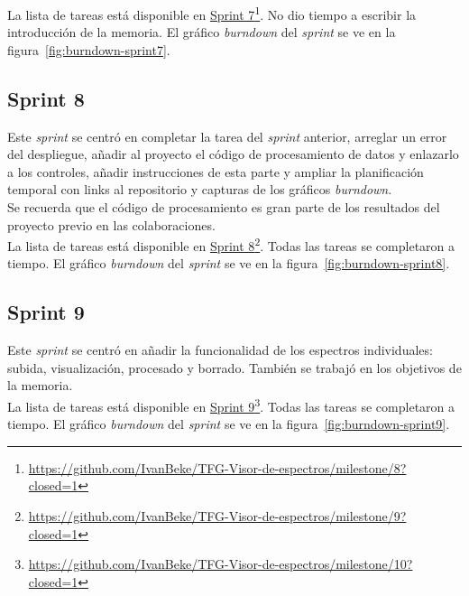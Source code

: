 La lista de tareas está disponible en
\href{https://github.com/IvanBeke/TFG-Visor-de-espectros/milestone/8?closed=1}{Sprint
	7}\footnote{\url{https://github.com/IvanBeke/TFG-Visor-de-espectros/milestone/8?closed=1}}.
No dio tiempo a escribir la introducción de la memoria. El gráfico
\textit{burndown} del \textit{sprint} se ve en la
figura~\ref{fig:burndown-sprint7}.\\


\subsection{Sprint 8}
Este \textit{sprint} se centró en completar la tarea del \textit{sprint}
anterior, arreglar un error del despliegue, añadir al proyecto el código
de procesamiento de datos y enlazarlo a los controles, añadir instrucciones de
esta parte y ampliar la planificación temporal con links al repositorio y
capturas de los gráficos \textit{burndown}.\\

Se recuerda que el código de procesamiento es gran parte de los resultados del
proyecto previo en las colaboraciones.\\

La lista de tareas está disponible en
\href{https://github.com/IvanBeke/TFG-Visor-de-espectros/milestone/9?closed=1}{Sprint
	8}\footnote{\url{https://github.com/IvanBeke/TFG-Visor-de-espectros/milestone/9?closed=1}}.
Todas las tareas se completaron a tiempo. El gráfico
\textit{burndown} del \textit{sprint} se ve en la
figura~\ref{fig:burndown-sprint8}.\\


\subsection{Sprint 9}
Este \textit{sprint} se centró en añadir la funcionalidad de los espectros
individuales: subida, visualización, procesado y borrado. También se trabajó en
los objetivos de la memoria.\\

La lista de tareas está disponible en
\href{https://github.com/IvanBeke/TFG-Visor-de-espectros/milestone/10?closed=1}{Sprint
	9}\footnote{\url{https://github.com/IvanBeke/TFG-Visor-de-espectros/milestone/10?closed=1}}.
Todas las tareas se completaron a tiempo. El gráfico
\textit{burndown} del \textit{sprint} se ve en la
figura~\ref{fig:burndown-sprint9}.\\

